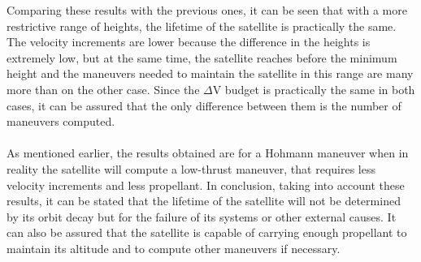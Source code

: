 \noindent
Comparing these results with the previous ones, it can be seen that with a more restrictive range of heights, the lifetime of the satellite is practically the same. The velocity increments are lower because the difference in the heights is extremely low, but at the same time, the satellite reaches before the minimum height and the maneuvers needed to maintain the satellite in this range are many more than on the other case. Since the $\Delta$V budget is practically the same in both cases, it can be assured that the only difference between them is the number of maneuvers computed.
\paragraph{}
As mentioned earlier, the results obtained are for a Hohmann maneuver when in reality the satellite will compute a low-thrust maneuver, that requires less velocity increments and less propellant. In conclusion, taking into account these results, it can be stated that the lifetime of the satellite will not be determined by its orbit decay but for the failure of its systems or other external causes. It can also be assured that the satellite is capable of carrying enough propellant to maintain its altitude and to compute other maneuvers if necessary.